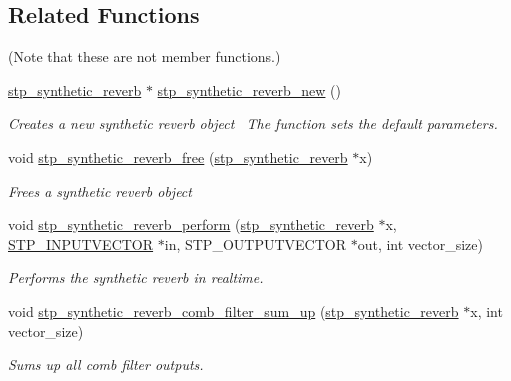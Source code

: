\subsection*{Related Functions}
(Note that these are not member functions.) \begin{DoxyCompactItemize}
\item 
\hyperlink{structstp__synthetic__reverb}{stp\+\_\+synthetic\+\_\+reverb} $\ast$ \hyperlink{structstp__synthetic__reverb_a8588857ee9bf58eaebcf308980ac1167}{stp\+\_\+synthetic\+\_\+reverb\+\_\+new} ()
\begin{DoxyCompactList}\small\item\em Creates a new synthetic reverb object~\newline
 The function sets the default parameters. ~\newline
 \end{DoxyCompactList}\item 
void \hyperlink{structstp__synthetic__reverb_aeebd2c68f0dc77806a15cf3224acc4ca}{stp\+\_\+synthetic\+\_\+reverb\+\_\+free} (\hyperlink{structstp__synthetic__reverb}{stp\+\_\+synthetic\+\_\+reverb} $\ast$x)
\begin{DoxyCompactList}\small\item\em Frees a synthetic reverb object~\newline
 \end{DoxyCompactList}\item 
void \hyperlink{structstp__synthetic__reverb_af385f69d342da49868fe1c9b8bf0a11a}{stp\+\_\+synthetic\+\_\+reverb\+\_\+perform} (\hyperlink{structstp__synthetic__reverb}{stp\+\_\+synthetic\+\_\+reverb} $\ast$x, \hyperlink{stp__defines_8h_a142134bffa517ce86ebf0bdcdbe975d2}{S\+T\+P\+\_\+\+I\+N\+P\+U\+T\+V\+E\+C\+T\+OR} $\ast$in, S\+T\+P\+\_\+\+O\+U\+T\+P\+U\+T\+V\+E\+C\+T\+OR $\ast$out, int vector\+\_\+size)
\begin{DoxyCompactList}\small\item\em Performs the synthetic reverb in realtime. ~\newline
 \end{DoxyCompactList}\item 
void \hyperlink{structstp__synthetic__reverb_ac3ac205de199cf3f87ba7618808b034e}{stp\+\_\+synthetic\+\_\+reverb\+\_\+comb\+\_\+filter\+\_\+sum\+\_\+up} (\hyperlink{structstp__synthetic__reverb}{stp\+\_\+synthetic\+\_\+reverb} $\ast$x, int vector\+\_\+size)
\begin{DoxyCompactList}\small\item\em Sums up all comb filter outputs. ~\newline

\end{DoxyCompactList}
\end{DoxyCompactItemize}
